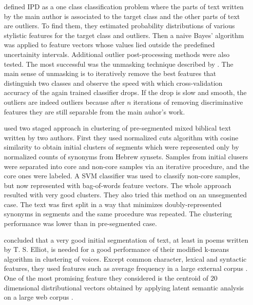 \documentclass[10pt, a4paper]{article}
\begin{document}
\citet{stein-2011} defined IPD as a one class classification problem where the parts of text written by the main author is associated to the target class and the other parts of text are outliers. To find them, they estimated probability distributions of various stylistic features for the target class and outliers. Then a naive Bayes' algorithm was applied to feature vectors whose values lied outside the predefined uncertainity intervals. Additional outlier post-processing methods were also tested. The most successful was the unmasking technique described by \citet{koppel-2009}. The main sense of unmasking is to iteratively remove the best features that distinguish two classes and observe the speed with which cross-validation accuracy of the again trained classifier drops. If the drop is slow and smooth, the outliers are indeed outliers because after $n$ iterations of removing discriminative features they are still separable from the main auhor's work.

\citet{koppel-2011} used two staged approach in clustering of pre-segmented mixed biblical text written by two authors. First they used normalized cuts algorithm with cosine similarity to obtain initial clusters of segments which were represented only by normalized counts of synonyms from Hebrew synsets. Samples from initial clusers were separated into core and non-core samples via an iterative procedure, and the core ones were labeled. A SVM classifier was used to classify non-core samples, but now represented with bag-of-words feature vectors. The whole approach resulted with very good clusters. They also tried this method on an unsegmented case. The text was first split in a way that minimizes doubly-represented synonyms in segments and the same procedure was repeated. The clustering performance was lower than in pre-segmented case.

\citet{brooke-2013} concluded that a very good initial segmentation of text, at least in poems written by T. S. Elliot, is needed for a good performance of their modified k-means algorithm in clustering of voices. Except common character, lexical and syntactic features, they used features such as average frequency in a large  external corpus \citep{brants-2006}. One of the most promising feature they considered is the centroid of $20$ dimensional distributional vectors obtained by applying latent semantic analysis on a large web corpus \cite{landauer-1997}.
\end{document}
